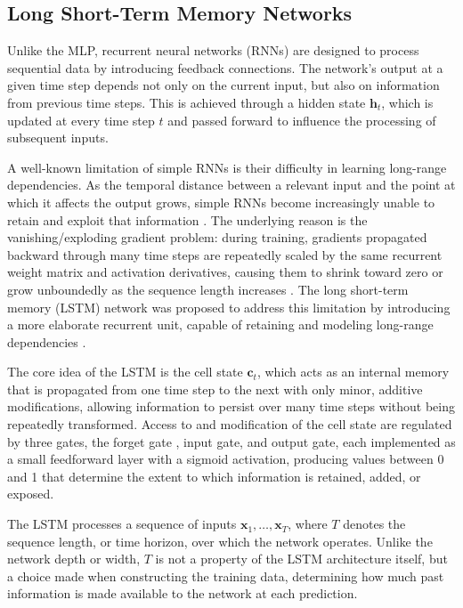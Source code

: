 \subsection{Long Short-Term Memory Networks}
\label{sec:lstm}

Unlike the MLP, recurrent neural networks (RNNs) are designed to process sequential data by introducing feedback connections. The network's output at a given time step depends not only on the current input, but also on information from previous time steps. This is achieved through a hidden state $\bm{h}_t$, which is updated at every time step $t$ and passed forward to influence the processing of subsequent inputs.

A well-known limitation of simple RNNs is their difficulty in learning long-range dependencies. As the temporal distance between a relevant input and the point at which it affects the output grows, simple RNNs become increasingly unable to retain and exploit that information \cite{Bengio1994DownsideRNN}. The underlying reason is the vanishing/exploding gradient problem: during training, gradients propagated backward through many time steps are repeatedly scaled by the same recurrent weight matrix and activation derivatives, causing them to shrink toward zero or grow unboundedly as the sequence length increases \cite{Hochreiter1991ExplGradients}. The long short-term memory (LSTM) network was proposed to address this limitation by introducing a more elaborate recurrent unit, capable of retaining and modeling long-range dependencies \cite{Hochreiter1997LSTM}.

The core idea of the LSTM is the cell state $\bm{c}_t$, which acts as an internal memory that is propagated from one time step to the next with only minor, additive modifications, allowing information to persist over many time steps without being repeatedly transformed. Access to and modification of the cell state are regulated by three gates, the forget gate \cite{Gers2000forget}, input gate, and output gate, each implemented as a small feedforward layer with a sigmoid activation, producing values between 0 and 1 that determine the extent to which information is retained, added, or exposed.

The LSTM processes a sequence of inputs $\bm{x}_1, \dots, \bm{x}_T$, where $T$ denotes the sequence length, or time horizon, over which the network operates. Unlike the network depth or width, $T$ is not a property of the LSTM architecture itself, but a choice made when constructing the training data, determining how much past information is made available to the network at each prediction.

